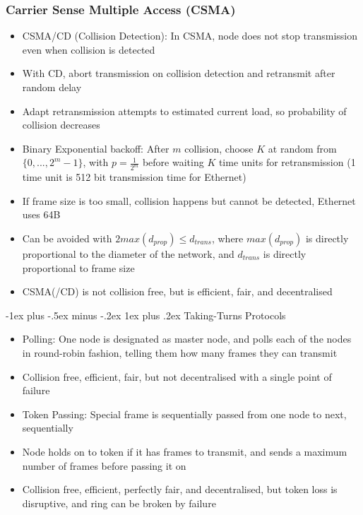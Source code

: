 \documentclass[10pt, landscape]{article}
\makeatletter
\renewcommand{\subsection}{\@startsection{subsection}{3}{0mm}%
                                {-1ex plus -.5ex minus -.2ex}%
                                {1ex plus .2ex}%
                                {\normalfont\small\bfseries}}%
\makeatother
\begin{document}
\begin{multicols*}{3}
\subsubsection{Carrier Sense Multiple Access (CSMA)}
\begin{itemize}
    \item CSMA/CD (Collision Detection): In CSMA, node does not stop transmission even when collision is detected
    \item With CD, abort transmission on collision detection and retransmit after random delay
    \item Adapt retransmission attempts to estimated current load, so probability of collision decreases
    \item Binary Exponential backoff: After $m$ collision, choose $K$ at random from $\{0,..., 2^m-1\}$, with $p=\frac{1}{2^m}$ before waiting $K$ time units for retransmission (1 time unit is 512 bit transmission time for Ethernet)
    \item If frame size is too small, collision happens but cannot be detected, Ethernet uses 64B
    \item Can be avoided with $2max(d_{prop})\leq d_{trans}$, where $max(d_{prop})$ is directly proportional to the diameter of the network, and $d_{trans}$ is directly proportional to frame size
    \item CSMA(/CD) is not collision free, but is efficient, fair, and decentralised
\end{itemize}

\subsection{Taking-Turns Protocols}
\begin{itemize}
    \item Polling: One node is designated as master node, and polls each of the nodes in round-robin fashion, telling them how many frames they can transmit
    \item Collision free, efficient, fair, but not decentralised with a single point of failure
    \item Token Passing: Special frame is sequentially passed from one node to next, sequentially
    \item Node holds on to token if it has frames to transmit, and sends a maximum number of frames before passing it on
    \item Collision free, efficient, perfectly fair, and decentralised, but token loss is disruptive, and ring can be broken by failure
\end{itemize}

\end{multicols*}
\end{document}
